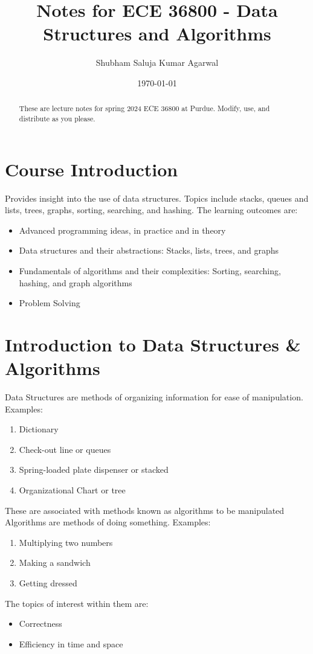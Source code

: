 \documentclass[nobib]{tufte-handout}
\title{Notes for ECE 36800 - Data Structures and Algorithms}
\author[Shubham Saluja Kumar Agarwal]{Shubham Saluja Kumar Agarwal}
\date{\today}  %
\begin{document}
\maketitle

\begin{abstract}
    These are lecture notes for spring 2024 ECE 36800 at Purdue. Modify, use, and distribute as you please.
\end{abstract}

\tableofcontents

\section{Course Introduction}
Provides insight into the use of data structures. Topics include stacks, queues
and lists, trees, graphs, sorting, searching, and hashing. The learning
outcomes are:
\begin{itemize}
    \item Advanced programming ideas, in practice and in theory
    \item Data structures and their abstractions: Stacks, lists, trees, and graphs
    \item Fundamentals of algorithms and their complexities: Sorting, searching, hashing,
          and graph algorithms
    \item Problem Solving
\end{itemize}
\pagebreak

\section{Introduction to Data Structures \& Algorithms}
Data Structures are methods of organizing information for ease of manipulation.
Examples:
\begin{enumerate}
    \item Dictionary
    \item Check-out line or queues
    \item Spring-loaded plate dispenser or stacked
    \item Organizational Chart or tree
\end{enumerate}
These are associated with methods known as algorithms to be manipulated\\
Algorithms are methods of doing something.
Examples:
\begin{enumerate}
    \item Multiplying two numbers
    \item Making a sandwich
    \item Getting dressed
\end{enumerate}
The topics of interest within them are:\\
\begin{itemize}
    \item Correctness
    \item Efficiency in time and space
\end{itemize}
\end{document}
